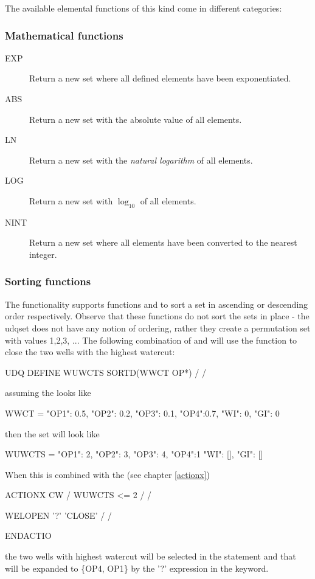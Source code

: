 The available elemental functions of this kind come in different categories:

\subsubsection*{Mathematical functions}
\begin{description}
\item[EXP] Return a new set where all defined elements have been exponentiated.
\item[ABS] Return a new set with the absolute value of all elements.
\item[LN] Return a new set with the \emph{natural logarithm} of all elements.
\item[LOG] Return a new set with $\log_{10}$ of all elements.
\item[NINT] Return a new set where all elements have been converted to the
  nearest integer.
\end{description}

\subsubsection*{Sorting functions}
The \udq{} functionality supports functions  and  to sort a
set in ascending or descending order respectively. Observe that these functions
do not sort the sets in place - the udqset does not have any notion of ordering,
rather they create a permutation set with values 1,2,3, ... The following
combination of \udq{} and  will use the  function to close
the two wells with the highest watercut:
\begin{deck}
UDQ
  DEFINE WUWCTS SORTD(WWCT OP*) /
/
\end{deck}
assuming the  looks like
\begin{code}
  WWCT = {"OP1": 0.5, "OP2": 0.2, "OP3": 0.1, "OP4":0.7, "WI": 0, "GI": 0}
\end{code}
then the  set will look like
\begin{code}
  WUWCTS = {"OP1": 2, "OP2": 3, "OP3": 4, "OP4":1 "WI": [], "GI": []}
\end{code}

When this is combined with the (see chapter \ref{actionx})
\begin{code}
ACTIONX
CW /
WUWCTS <= 2 /
/

WELOPEN
'?'  'CLOSE' /
/

ENDACTIO
\end{code}
the two wells with highest watercut will be selected in the  statement and that will be expanded to \{OP4, OP1\} by the '?'
expression in the  keyword.


